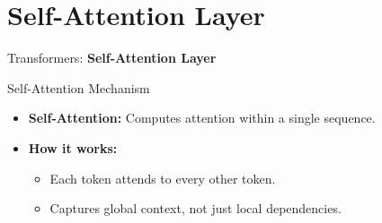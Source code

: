 \section{Self-Attention Layer}
\begin{frame}{}
    \LARGE Transformers: \textbf{Self-Attention Layer}
\end{frame}

\begin{frame}{Self-Attention Mechanism}
    \begin{itemize}
        \item \textbf{Self-Attention:} Computes attention within a single sequence.
        \item \textbf{How it works:}
        \begin{itemize}
            \item Each token attends to every other token.
            \item Captures global context, not just local dependencies.
        \end{itemize}
    \end{itemize}
\end{frame}

